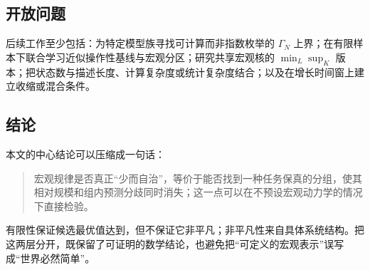 \subsection{开放问题}

后续工作至少包括：为特定模型族寻找可计算而非指数枚举的 $\Gamma_N$ 上界；在有限样本下联合学习近似操作性基线与宏观分区；研究共享宏观核的 $\min_L\sup_K$ 版本；把状态数与描述长度、计算复杂度或统计复杂度结合；以及在增长时间窗上建立收缩或混合条件。

\subsection{结论}

本文的中心结论可以压缩成一句话：

\begin{quote}
宏观规律是否真正“少而自治”，等价于能否找到一种任务保真的分组，使其相对规模和组内预测分歧同时消失；这一点可以在不预设宏观动力学的情况下直接检验。
\end{quote}

有限性保证候选最优值达到，但不保证它非平凡；非平凡性来自具体系统结构。把这两层分开，既保留了可证明的数学结论，也避免把“可定义的宏观表示”误写成“世界必然简单”。
